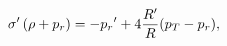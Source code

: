 \begin{equation}
\sigma'\left(\rho+{p_r}\right)=-{p_r}'+4{{R'}\over{R}}({p_T}-{p_r}),\label{cee}
\end{equation}

